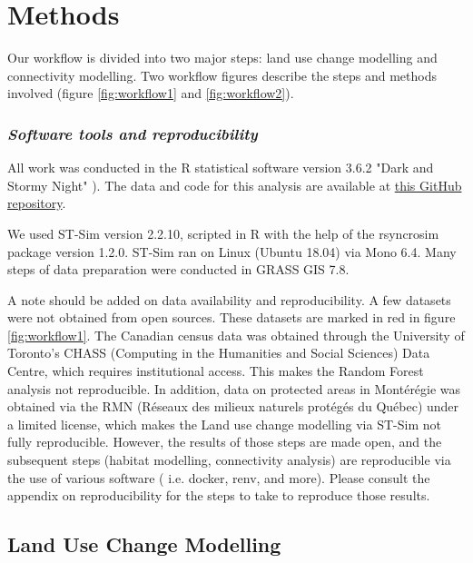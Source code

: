 \section{Methods}

Our workflow is divided into two major steps: land use change modelling and connectivity modelling. Two workflow figures describe the steps and methods involved (figure \ref{fig:workflow1} and \ref{fig:workflow2}). \\ 

\subsubsection*{\textit{Software tools and reproducibility}}

All work was conducted in the R statistical software version 3.6.2 "Dark and Stormy Night" \citep[see][]{R}). The data and code for this analysis are available at \href{https://github.com/VLucet/landchange-connectivity-Montérégie}{this GitHub repository}. 

We used ST-Sim version 2.2.10, scripted in R with the help of the rsyncrosim package version 1.2.0. ST-Sim ran on Linux (Ubuntu 18.04) via Mono 6.4. Many steps of data preparation were conducted in GRASS GIS 7.8. 

A note should be added on data availability and reproducibility. A few datasets were not obtained from open sources. These datasets are marked in red in figure \ref{fig:workflow1}. The Canadian census data was obtained through the University of Toronto's CHASS (Computing in the Humanities and Social Sciences) Data Centre, which requires institutional access. This makes the Random Forest analysis not reproducible. In addition, data on protected areas in Montérégie was obtained  via the RMN (Réseaux des milieux naturels protégés du Québec) under a limited license, which makes the Land use change modelling via ST-Sim not fully reproducible. However, the results of those steps are made open, and the subsequent steps (habitat modelling, connectivity analysis) are reproducible via the use of various software ( i.e. docker, renv, and more). Please consult the appendix on reproducibility for the steps to take to reproduce those results. \\ %

\subsection{Land Use Change Modelling}

